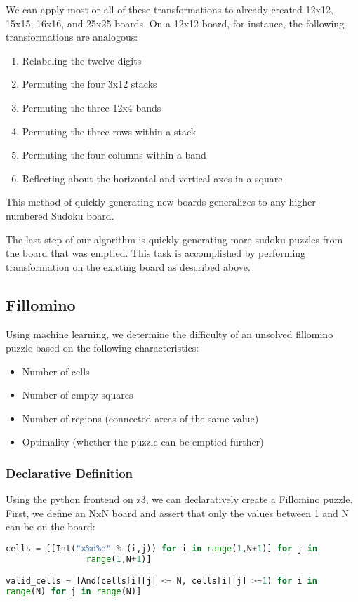  
We can apply most or all of these transformations to already-created
12x12, 15x15, 16x16, and 25x25 boards. On a 12x12 board, for instance,
the following transformations are analogous:


\begin{enumerate}
\item Relabeling the twelve digits
\item Permuting the four 3x12 stacks
\item Permuting the three 12x4 bands
\item Permuting the three rows within a stack
\item Permuting the four columns within a band
\item Reflecting about the horizontal and vertical axes in a square
\end{enumerate}
 
This method of quickly generating new boards generalizes to any
higher-numbered Sudoku board. 


The last step of our algorithm is quickly generating more sudoku
puzzles from the board that was emptied. This task is accomplished by
performing transformation on the existing board as described above.


\subsection{Fillomino}

Using machine learning, we determine the difficulty of an unsolved
fillomino puzzle based on the following characteristics:


\begin{itemize}
\item Number of cells
\item Number of empty squares
\item Number of regions (connected areas of the same value)
\item Optimality (whether the puzzle can be emptied further)
\end{itemize}

\subsubsection{Declarative Definition}
Using the python frontend on z3, we can declaratively create a Fillomino puzzle.
First, we define an NxN board and assert that only the values between
1 and N can be on the board: 

\begin{lstlisting}[language=python]
cells = [[Int("x%d%d" % (i,j)) for i in range(1,N+1)] for j in
                range(1,N+1)]

valid_cells = [And(cells[i][j] <= N, cells[i][j] >=1) for i in
range(N) for j in range(N)]
\end{lstlisting}

